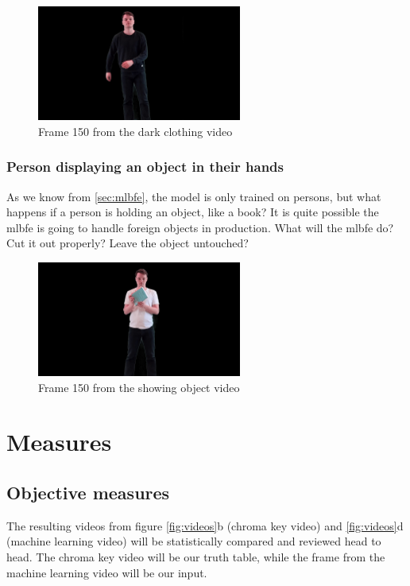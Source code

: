 \begin{figure}[H]
    \centering
    \includegraphics[width=0.6\textwidth]{img/video_frame_150/FG_Rocking-Dark_150.jpg}
    \caption{Frame 150 from the dark clothing video}
    \label{fig:foreground_dark_clothing}
\end{figure}


\subsubsection{Person displaying an object in their hands}
As we know from \autoref{sec:mlbfe}, the model is only trained on persons, but what happens if a person is holding an object, like a book? It is quite possible the \acrshort{mlbfe} is going to handle foreign objects in production. What will the \acrshort{mlbfe} do? Cut it out properly? Leave the object untouched?

\begin{figure}[H]
    \centering
    \includegraphics[width=0.6\textwidth]{img/video_frame_150/FG_Showing-Object_150.jpg}
    \caption{Frame 150 from the showing object video}
    \label{fig:foreground_showing_object}
\end{figure}



\section{Measures}
\subsection{Objective measures}
The resulting videos from figure \ref{fig:videos}b (chroma key video) and \ref{fig:videos}d (machine learning video) will be statistically compared and reviewed head to head. The chroma key video will be our truth table, while the frame from the machine learning video will be our input. 

